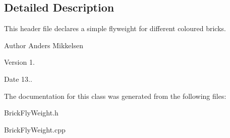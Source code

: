 \subsection{Detailed Description}
This header file declares a simple flyweight for different coloured bricks. 

\begin{DoxyAuthor}{Author}
Anders Mikkelsen 
\end{DoxyAuthor}
\begin{DoxyVersion}{Version}
1. 
\end{DoxyVersion}
\begin{DoxyDate}{Date}
13.. 
\end{DoxyDate}


The documentation for this class was generated from the following files\+:\begin{DoxyCompactItemize}
\item 
Brick\+Fly\+Weight.\+h\item 
Brick\+Fly\+Weight.\+cpp\end{DoxyCompactItemize}
